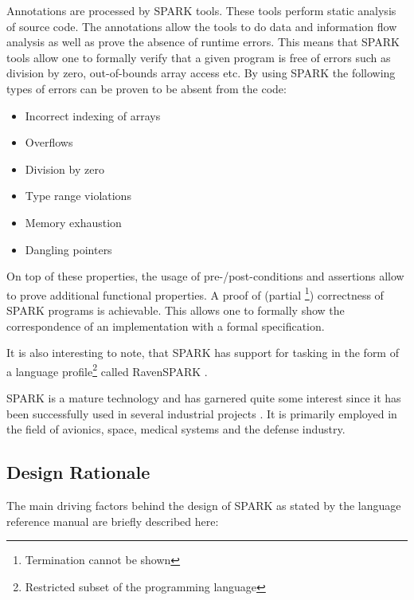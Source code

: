 Annotations are processed by SPARK tools. These tools perform static analysis of
source code. The annotations allow the tools to do data and information flow
analysis as well as prove the absence of runtime errors. This means that SPARK
tools allow one to formally verify that a given program is free of errors such
as division by zero, out-of-bounds array access etc. By using SPARK the
following types of errors can be proven to be absent from the code:

\begin{itemize}
	\item Incorrect indexing of arrays
	\item Overflows
	\item Division by zero
	\item Type range violations
	\item Memory exhaustion
	\item Dangling pointers
\end{itemize}

On top of these properties, the usage of pre-/post-conditions and assertions
allow to prove additional functional properties. A proof of (partial
\footnote{Termination cannot be shown}) correctness of SPARK programs is
achievable. This allows one to formally show the correspondence of an
implementation with a formal specification.

It is also interesting to note, that SPARK has support for tasking in the form
of a language profile\footnote{Restricted subset of the programming language}
called RavenSPARK \cite{RavenSPARK}.

SPARK is a mature technology and has garnered quite some interest since it has
been successfully used in several industrial projects
\cite{Chapman:2000:IES:369264.369270}. It is primarily employed in the field of
avionics, space, medical systems and the defense industry.

\subsection{Design Rationale}
The main driving factors behind the design of SPARK as stated by the language
reference manual \cite{SPARK} are briefly described here:

